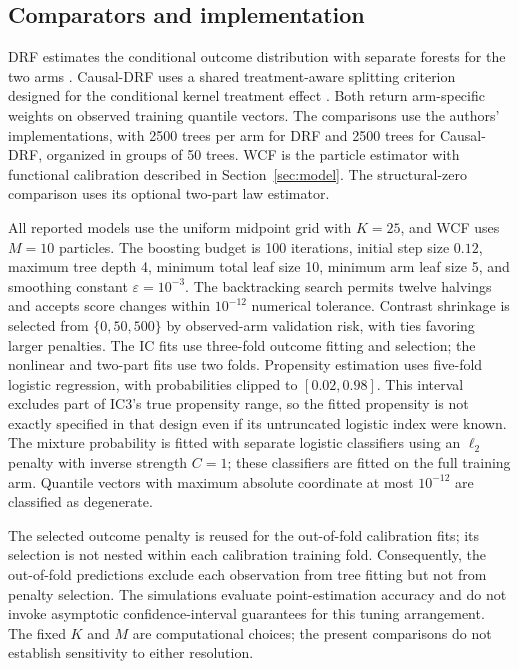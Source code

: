\subsection{Comparators and implementation}\label{sec:implementation}

DRF estimates the conditional outcome distribution with separate forests for the two arms \citep{DRF-paper}. Causal-DRF uses a shared treatment-aware splitting criterion designed for the conditional kernel treatment effect \citep{naf2026causaldrf}. Both return arm-specific weights on observed training quantile vectors. The comparisons use the authors' implementations, with 2500 trees per arm for DRF and 2500 trees for Causal-DRF, organized in groups of 50 trees. WCF is the particle estimator with functional calibration described in Section~\ref{sec:model}. The structural-zero comparison uses its optional two-part law estimator.

All reported models use the uniform midpoint grid with $K=25$, and WCF uses $M=10$ particles. The boosting budget is 100 iterations, initial step size $0.12$, maximum tree depth 4, minimum total leaf size 10, minimum arm leaf size 5, and smoothing constant $\varepsilon=10^{-3}$. The backtracking search permits twelve halvings and accepts score changes within $10^{-12}$ numerical tolerance. Contrast shrinkage is selected from $\{0,50,500\}$ by observed-arm validation risk, with ties favoring larger penalties. The IC fits use three-fold outcome fitting and selection; the nonlinear and two-part fits use two folds. Propensity estimation uses five-fold logistic regression, with probabilities clipped to $[0.02,0.98]$. This interval excludes part of IC3's true propensity range, so the fitted propensity is not exactly specified in that design even if its untruncated logistic index were known. The mixture probability is fitted with separate logistic classifiers using an $\ell_2$ penalty with inverse strength $C=1$; these classifiers are fitted on the full training arm. Quantile vectors with maximum absolute coordinate at most $10^{-12}$ are classified as degenerate.

The selected outcome penalty is reused for the out-of-fold calibration fits; its selection is not nested within each calibration training fold. Consequently, the out-of-fold predictions exclude each observation from tree fitting but not from penalty selection. The simulations evaluate point-estimation accuracy and do not invoke asymptotic confidence-interval guarantees for this tuning arrangement. The fixed $K$ and $M$ are computational choices; the present comparisons do not establish sensitivity to either resolution.


